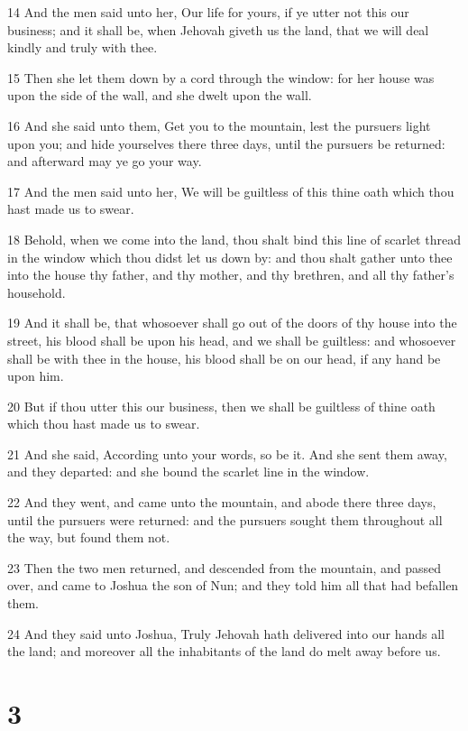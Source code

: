 \par 14 And the men said unto her, Our life for yours, if ye utter not this our business; and it shall be, when Jehovah giveth us the land, that we will deal kindly and truly with thee.
\par 15 Then she let them down by a cord through the window: for her house was upon the side of the wall, and she dwelt upon the wall.
\par 16 And she said unto them, Get you to the mountain, lest the pursuers light upon you; and hide yourselves there three days, until the pursuers be returned: and afterward may ye go your way.
\par 17 And the men said unto her, We will be guiltless of this thine oath which thou hast made us to swear.
\par 18 Behold, when we come into the land, thou shalt bind this line of scarlet thread in the window which thou didst let us down by: and thou shalt gather unto thee into the house thy father, and thy mother, and thy brethren, and all thy father's household.
\par 19 And it shall be, that whosoever shall go out of the doors of thy house into the street, his blood shall be upon his head, and we shall be guiltless: and whosoever shall be with thee in the house, his blood shall be on our head, if any hand be upon him.
\par 20 But if thou utter this our business, then we shall be guiltless of thine oath which thou hast made us to swear.
\par 21 And she said, According unto your words, so be it. And she sent them away, and they departed: and she bound the scarlet line in the window.
\par 22 And they went, and came unto the mountain, and abode there three days, until the pursuers were returned: and the pursuers sought them throughout all the way, but found them not.
\par 23 Then the two men returned, and descended from the mountain, and passed over, and came to Joshua the son of Nun; and they told him all that had befallen them.
\par 24 And they said unto Joshua, Truly Jehovah hath delivered into our hands all the land; and moreover all the inhabitants of the land do melt away before us.

\chapter{3}

